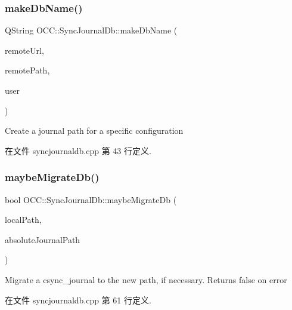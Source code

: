 \subsubsection{\texorpdfstring{make\+Db\+Name()}{makeDbName()}}
{\footnotesize\ttfamily Q\+String O\+C\+C\+::\+Sync\+Journal\+Db\+::make\+Db\+Name (\begin{DoxyParamCaption}\item[{const Q\+Url \&}]{remote\+Url,  }\item[{const Q\+String \&}]{remote\+Path,  }\item[{const Q\+String \&}]{user }\end{DoxyParamCaption})\hspace{0.3cm}{\ttfamily [static]}}



Create a journal path for a specific configuration 



在文件 syncjournaldb.\+cpp 第 43 行定义.

\mbox{\label{class_o_c_c_1_1_sync_journal_db_af2385a1c48b7890187404a190f3a31f7}} 
\subsubsection{\texorpdfstring{maybe\+Migrate\+Db()}{maybeMigrateDb()}}
{\footnotesize\ttfamily bool O\+C\+C\+::\+Sync\+Journal\+Db\+::maybe\+Migrate\+Db (\begin{DoxyParamCaption}\item[{const Q\+String \&}]{local\+Path,  }\item[{const Q\+String \&}]{absolute\+Journal\+Path }\end{DoxyParamCaption})\hspace{0.3cm}{\ttfamily [static]}}



Migrate a csync\+\_\+journal to the new path, if necessary. Returns false on error 



在文件 syncjournaldb.\+cpp 第 61 行定义.

\mbox{\label{class_o_c_c_1_1_sync_journal_db_ab422af01a298b8ef1ffabb4c7bc9401e}} 
